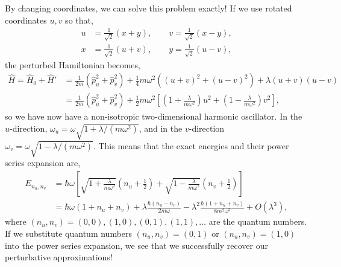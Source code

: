 \documentclass[10pt]{article}
\newcommand{\1}{\mathbf 1}
\begin{document}
By changing coordinates, we can solve this problem exactly!
If we use rotated coordinates $u,v$ so that,
\begin{align}
	u &= \frac{1}{\sqrt{2}}(x + y),
	\qquad
	v = \frac{1}{\sqrt{2}}(x - y),
	\\
	x &= \frac{1}{\sqrt{2}}(u + v),
	\qquad
	y = \frac{1}{\sqrt{2}}(u - v),
\end{align}
the perturbed Hamiltonian becomes,
\begin{align}
	\hat H
	=
	\hat H_0
	+
	\hat H'
	&=\nonumber
	\frac{1}{2m} ( \hat p_u^2 + \hat p_v^2)
	+
	\frac{1}{4} m \omega^2
	\left(
		(u+v)^2
		+
		(u-v)^2
	\right)
		+
	\lambda
	(u+v)
	(u-v)
	\\
	&=
	\frac{1}{2m} ( \hat p_u^2 + \hat p_v^2)
	+
	\frac{1}{2} m \omega^2
	\left[
		\left(
			1 + \frac{\lambda}{m \omega^2}
		\right)
		u^2
		+
		\left(
			1 - \frac{\lambda}{m \omega^2}
		\right)
		v^2
	\right],
\end{align}
so we have now have a non-isotropic two-dimensional harmonic oscillator.
In the $u$-direction, $\omega_u = \omega \sqrt{1+ \lambda/(m \omega^2)}$, and in the $v$-direction $\omega_v = \omega \sqrt{1- \lambda/(m \omega^2)}$.
This means that the exact energies and their power series expansion are,
\begin{align}
	E_{n_u,n_v}
	&=
	\hbar \omega
	\left[
		\sqrt{1+\frac{\lambda}{m \omega^2}}
		\left(
		n_u + \frac{1}{2}	
		\right)
		+
		\sqrt{1-\frac{\lambda}{m \omega^2}}
		\left(
		n_v + \frac{1}{2}	
		\right)
	\right]
	\\
	&=
	\hbar \omega 
	\left(
		1+ n_u + n_v
	\right)
	+
	\lambda
	\frac{\hbar (n_u - n_v)}{2 m \omega}
	-
	\lambda^2
	\frac{\hbar (1+ n_u + n_v)}{8 m^2 \omega^3}
	+ 
	O(\lambda^3)
	,
\end{align}
where $(n_u,n_v) = (0,0),(1,0),(0,1),(1,1),\dots$ are the quantum numbers.
If we substitute quantum numbers $(n_u,n_v) = (0,1)$ or  $(n_u,n_v) = (1,0)$ into the power series expansion, we see that we successfully recover our perturbative approximations!
\end{document}
